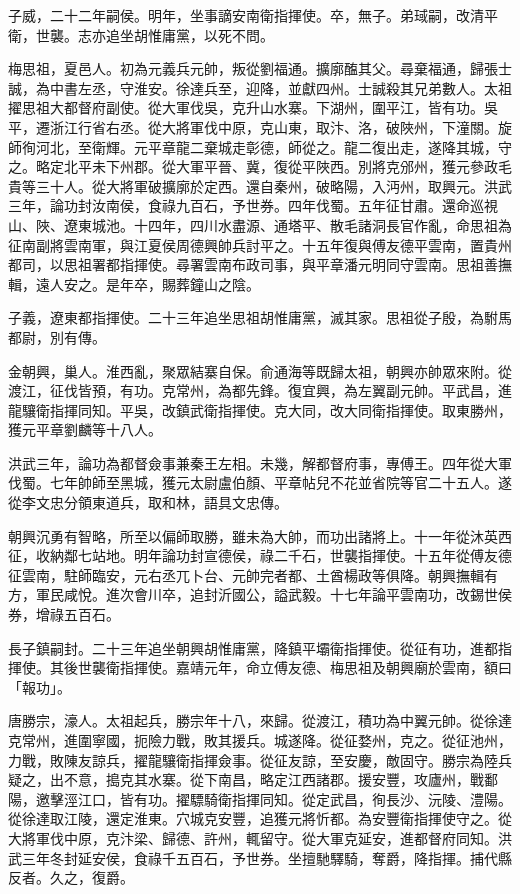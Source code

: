 \begin{pinyinscope}
子威，二十二年嗣侯。明年，坐事謫安南衛指揮使。卒，無子。弟琙嗣，改清平衛，世襲。志亦追坐胡惟庸黨，以死不問。

梅思祖，夏邑人。初為元義兵元帥，叛從劉福通。擴廓醢其父。尋棄福通，歸張士誠，為中書左丞，守淮安。徐達兵至，迎降，並獻四州。士誠殺其兄弟數人。太祖擢思祖大都督府副使。從大軍伐吳，克升山水寨。下湖州，圍平江，皆有功。吳平，遷浙江行省右丞。從大將軍伐中原，克山東，取汴、洛，破陜州，下潼關。旋師徇河北，至衛輝。元平章龍二棄城走彰德，師從之。龍二復出走，遂降其城，守之。略定北平未下州郡。從大軍平晉、冀，復從平陜西。別將克邠州，獲元參政毛貴等三十人。從大將軍破擴廓於定西。還自秦州，破略陽，入沔州，取興元。洪武三年，論功封汝南侯，食祿九百石，予世券。四年伐蜀。五年征甘肅。還命巡視山、陜、遼東城池。十四年，四川水盡源、通塔平、散毛諸洞長官作亂，命思祖為征南副將雲南軍，與江夏侯周德興帥兵討平之。十五年復與傅友德平雲南，置貴州都司，以思祖署都指揮使。尋署雲南布政司事，與平章潘元明同守雲南。思祖善撫輯，遠人安之。是年卒，賜葬鐘山之陰。

子義，遼東都指揮使。二十三年追坐思祖胡惟庸黨，滅其家。思祖從子殷，為駙馬都尉，別有傳。

金朝興，巢人。淮西亂，聚眾結寨自保。俞通海等既歸太祖，朝興亦帥眾來附。從渡江，征伐皆預，有功。克常州，為都先鋒。復宜興，為左翼副元帥。平武昌，進龍驤衛指揮同知。平吳，改鎮武衛指揮使。克大同，改大同衛指揮使。取東勝州，獲元平章劉麟等十八人。

洪武三年，論功為都督僉事兼秦王左相。未幾，解都督府事，專傅王。四年從大軍伐蜀。七年帥師至黑城，獲元太尉盧伯顏、平章帖兒不花並省院等官二十五人。遂從李文忠分領東道兵，取和林，語具文忠傳。

朝興沉勇有智略，所至以偏師取勝，雖未為大帥，而功出諸將上。十一年從沐英西征，收納鄰七站地。明年論功封宣德侯，祿二千石，世襲指揮使。十五年從傅友德征雲南，駐師臨安，元右丞兀卜台、元帥完者都、土酋楊政等俱降。朝興撫輯有方，軍民咸悅。進次會川卒，追封沂國公，謚武毅。十七年論平雲南功，改錫世侯券，增祿五百石。

長子鎮嗣封。二十三年追坐朝興胡惟庸黨，降鎮平壩衛指揮使。從征有功，進都指揮使。其後世襲衛指揮使。嘉靖元年，命立傅友德、梅思祖及朝興廟於雲南，額曰「報功」。

唐勝宗，濠人。太祖起兵，勝宗年十八，來歸。從渡江，積功為中翼元帥。從徐達克常州，進圍寧國，扼險力戰，敗其援兵。城遂降。從征婺州，克之。從征池州，力戰，敗陳友諒兵，擢龍驤衛指揮僉事。從征友諒，至安慶，敵固守。勝宗為陸兵疑之，出不意，搗克其水寨。從下南昌，略定江西諸郡。援安豐，攻廬州，戰鄱陽，邀擊涇江口，皆有功。擢驃騎衛指揮同知。從定武昌，徇長沙、沅陵、澧陽。從徐達取江陵，還定淮東。穴城克安豐，追獲元將忻都。為安豐衛指揮使守之。從大將軍伐中原，克汴梁、歸德、許州，輒留守。從大軍克延安，進都督府同知。洪武三年冬封延安侯，食祿千五百石，予世券。坐擅馳驛騎，奪爵，降指揮。捕代縣反者。久之，復爵。


\end{pinyinscope}
